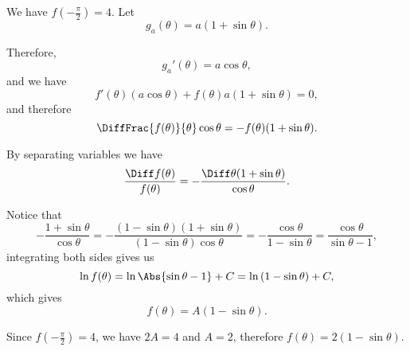 We have \(f\left(-\frac{\pi}{2}\right) = 4\). Let
\[
    g_a(\theta) = a(1 + \sin \theta).
\]

Therefore,
\[
    g_a'(\theta) = a \cos \theta,
\]
and we have
\[
    f'(\theta) (a \cos \theta) + f(\theta) a (1 + \sin \theta) = 0,
\]
and therefore
\[
    \DiffFrac{f(\theta)}{\theta} \cos \theta = - f(\theta) (1 + \sin \theta).
\]

By separating variables we have
\[
    \frac{\Diff f(\theta)}{f(\theta)} = - \frac{\Diff \theta (1 + \sin \theta)}{\cos \theta}.
\]

Notice that
\[
    -\frac{1 + \sin \theta}{\cos \theta} = - \frac{(1 - \sin \theta) (1 + \sin \theta)}{(1 - \sin \theta) \cos \theta} = - \frac{\cos \theta}{1 - \sin \theta} = \frac{\cos \theta}{\sin \theta - 1},
\]
integrating both sides gives us
\[
    \ln f(\theta) = \ln \Abs{\sin \theta - 1} + C = \ln \left(1 - \sin \theta\right) + C,
\]
which gives
\[
    f(\theta) = A (1 - \sin \theta).
\]

Since \(f\left(-\frac{\pi}{2}\right) = 4\), we have \(2A = 4\) and \(A = 2\), therefore \(f(\theta) = 2 (1 - \sin \theta)\).

\begin{center}
    
\end{center}